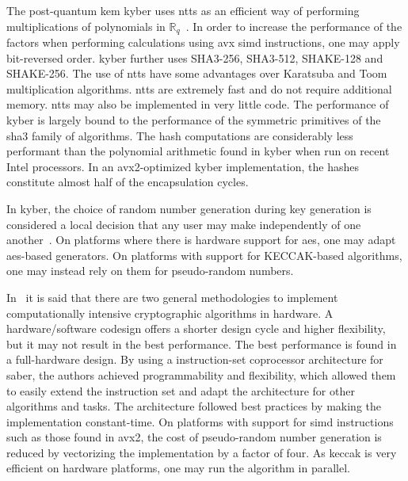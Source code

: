 The \gls{post-quantum} \gls{kem} \gls{kyber} uses \glspl{ntt} as an efficient way of performing multiplications of polynomials in $\mathbb{R}_q$~\cite{kyber2021}. In order to increase the performance of the factors when performing calculations using \gls{avx} \gls{simd} instructions, one may apply bit-reversed order. \gls{kyber} further uses SHA3-256, SHA3-512, SHAKE-128 and SHAKE-256. The use of \glspl{ntt} have some advantages over Karatsuba and Toom multiplication algorithms. \glspl{ntt} are extremely fast and do not require additional memory. \glspl{ntt} may also be implemented in very little code. The performance of \gls{kyber} is largely bound to the performance of the symmetric primitives of the \gls{sha3} family of algorithms. The hash computations are considerably less performant than the polynomial arithmetic found in \gls{kyber} when run on recent Intel processors. In an \gls{avx2}-optimized \gls{kyber} implementation, the hashes constitute almost half of the encapsulation cycles.

In \gls{kyber}, the choice of random number generation during key generation is considered a local decision that any user may make independently of one another~\cite{kyber2021}. On platforms where there is hardware support for \gls{aes}, one may adapt \gls{aes}-based generators. On platforms with support for KECCAK-based algorithms, one may instead rely on them for pseudo-random numbers.


In~\cite{roy2020} it is said that there are two general methodologies to implement computationally intensive cryptographic algorithms in hardware. A hardware/software codesign offers a shorter design cycle and higher flexibility, but it may not result in the best performance. The best performance is found in a full-hardware design. By using a instruction-set coprocessor architecture for \gls{saber}, the authors achieved programmability and flexibility, which allowed them to easily extend the instruction set and adapt the architecture for other algorithms and tasks. The architecture followed best practices by making the implementation constant-time. On platforms with support for \gls{simd} instructions such as those found in \gls{avx2}, the cost of pseudo-random number generation is reduced by vectorizing the implementation by a factor of four. As \gls{keccak} is very efficient on hardware platforms, one may run the algorithm in parallel.